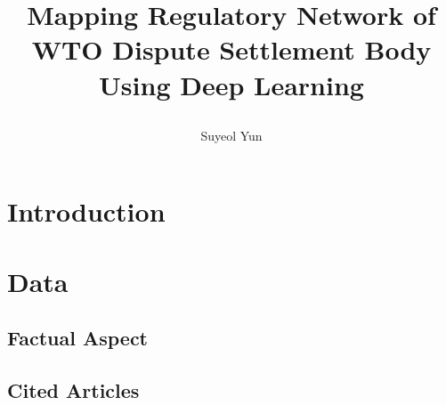 \documentclass[12pt,letterpaper]{article}
\newcommand{\tit}{
\bf 
Mapping Regulatory Network of WTO Dispute Settlement Body Using Deep Learning
}
\newcommand\spacingset[1]{\renewcommand{\baselinestretch}
{#1}\small\normalsize}
\begin{document}
\spacingset{1.25}

\setcounter{page}{0}
\vspace{-.1in}

{\title{
    \tit
  }
  \author{Suyeol Yun
  }
  \maketitle
}

\thispagestyle{empty}
\vspace{-.1in}

\begin{abstract}
\end{abstract}

\spacingset{1.5} %

% 


\section{Introduction}











\section{Data}


% 

\subsection{Factual Aspect}


\subsection{Cited Articles}

\end{document}
